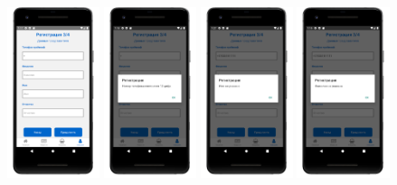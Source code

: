 \begin{figure}[!htb]\centering
    \begin{minipage}{0.19\textwidth}
        \centering

        \includegraphics[height=5cm]
        {images/mobile/registration/step3.png}
    \end{minipage}
    \begin{minipage}{0.19\textwidth}
        \centering

        \includegraphics[height=5cm]
        {images/mobile/registration/phone.png}
    \end{minipage}
    \begin{minipage}{0.19\textwidth}
        \centering

        \includegraphics[height=5cm]
        {images/mobile/registration/name.png}
    \end{minipage}
    \begin{minipage}{0.19\textwidth}
        \centering

        \includegraphics[height=5cm]
        {images/mobile/registration/surname.png}
    \end{minipage}


\end{figure}
